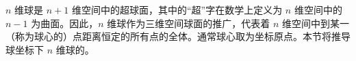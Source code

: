 
$n$ 维球是 $n+1$ 维空间中的超球面，其中的“超”字在数学上定义为 $n$ 维空间中的 $n-1$ 为曲面。因此，$n$ 维球作为三维空间球面的推广，代表着 $n$ 维空间中到某一（称为球心的）点距离恒定的所有点的全体。通常球心取为坐标原点。本节将推导球坐标下 $n$ 维球的。

\subsection{}











